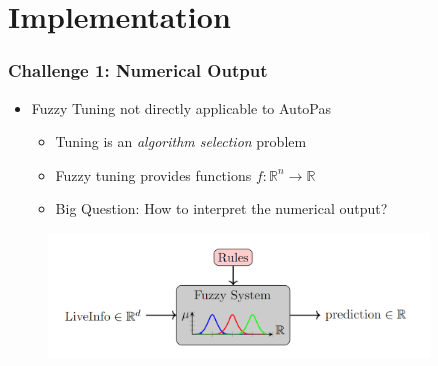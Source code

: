 \documentclass[
	10pt,
	t		%
]{beamer}
\begin{document}
\section{Implementation}
\begin{frame}
	\frametitle{Challenge 1: Numerical Output}
	
	\begin{itemize}
		\item Fuzzy Tuning not directly applicable to AutoPas
		      \begin{itemize}
			      \item Tuning is an \textit{algorithm selection} problem
			      \item Fuzzy tuning provides functions $f :\mathbb{R}^n \rightarrow \mathbb{R}$
			      \item Big Question: How to interpret the numerical output?
		      \end{itemize}
	\end{itemize}
	
	
	\begin{figure}
		\centering
		\includegraphics[width=0.9\textwidth]{figures/single-fuzzy-system.png}
	\end{figure}
\end{frame}
\end{document}
